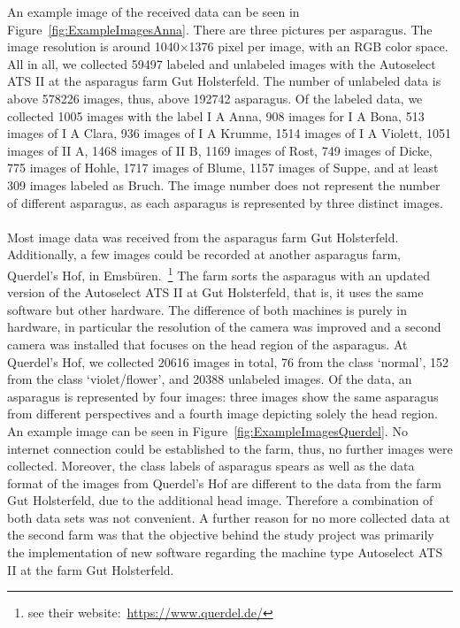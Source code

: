 An example image of the received data can be seen in Figure~\ref{fig:ExampleImagesAnna}. There are three pictures per asparagus. The image resolution is around 1040$\times$1376 pixel per image, with an RGB color space. \\
All in all, we collected 59497 labeled and unlabeled images with the Autoselect ATS II at the asparagus farm Gut Holsterfeld. The number of unlabeled data is above 578226 images, thus, above 192742 asparagus. Of the labeled data, we collected 1005 images with the label I A Anna,  908 images for I A Bona, 513 images of I A Clara, 936 images of I A Krumme, 1514 images of I A Violett, 1051 images of II A, 1468 images of II B, 1169 images of Rost, 749 images of Dicke, 775 images of Hohle, 1717 images of Blume, 1157 images of Suppe, and at least 309 images labeled as Bruch. The image number does not represent the number of different asparagus, as each asparagus is represented by three distinct images. \\
\\
Most image data was received from the asparagus farm Gut Holsterfeld. Additionally, a few images could be recorded at another asparagus farm, Querdel’s Hof, in Emsbüren.~\footnote{see their website:~\url{https://www.querdel.de/}} The farm sorts the asparagus with an updated version of the Autoselect ATS II at Gut Holsterfeld, that is, it uses the same software but other hardware. The difference of both machines is purely in hardware, in particular the resolution of the camera was improved and a second camera was installed that focuses on the head region of the asparagus. At Querdel’s Hof, we collected 20616 images in total, 76 from the class ‘normal’, 152 from the class ‘violet/flower’, and 20388 unlabeled images. Of the data, an asparagus is represented by four images: three images show the same asparagus from different perspectives and a fourth image depicting solely the head region. An example image can be seen in Figure~\ref{fig:ExampleImagesQuerdel}. No internet connection could be established to the farm, thus, no further images were collected. Moreover, the class labels of asparagus spears as well as the data format of the images from Querdel’s Hof are different to the data from the farm Gut Holsterfeld, due to the additional head image. Therefore a combination of both data sets was not convenient. A further reason for no more collected data at the second farm was that the objective behind the study project was primarily the implementation of new software regarding the machine type Autoselect ATS II at the farm Gut Holsterfeld.  \\

